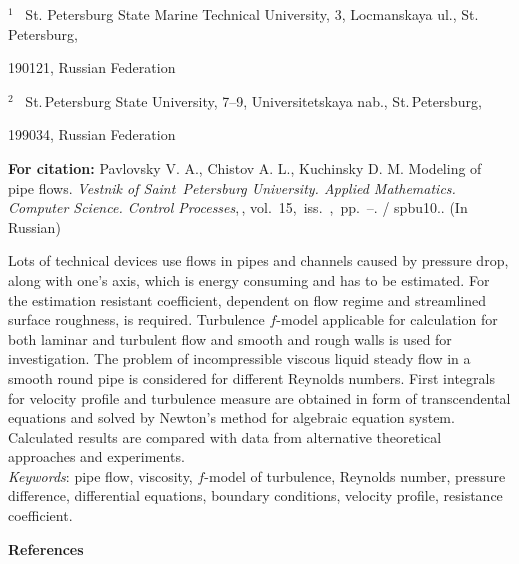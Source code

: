
{\normalsize

\vskip 6mm


}

\vskip 2mm

{\small


\vskip 2mm



{\footnotesize

\noindent%
$^1$~%
St. Petersburg State Marine Technical University, 3, Locmanskaya
ul., St. Petersburg,

\noindent%
\hskip2.45mm%
190121, Russian Federation

\noindent%
$^2$~%
St.\,Petersburg State University, 7--9, Universitetskaya nab.,
St.\,Petersburg,

\noindent%
\hskip2.45mm%
199034, Russian Federation

}


\vskip3mm


\noindent \textbf{For citation:}  Pavlovsky V. A., Chistov A. L.,
Kuchinsky D. M. Modeling of pipe flows. {\it Vestnik of
Saint~Petersburg University. Applied Mathematics. Computer
Science. Control Processes},\,\issueyear,
vol.~15,~iss.~\issuenum,~pp.~\pageref{p7}--\pageref{p7e}.
\doivyp/\enskip%
\!\!\!spbu10.\issueyear.  (In Russian)

\vskip3mm

{\leftskip=7mm\noindent Lots of technical devices use flows in
pipes and channels caused by pressure drop, along with one's axis,
which is energy consuming and has to be estimated.    For the
estimation resistant coefficient, dependent on flow regime and
streamlined surface roughness, is required. Turbulence $f$-model
applicable for calculation for both laminar and turbulent flow and
smooth and rough walls is used for investigation. The problem of
incompressible viscous liquid steady flow in a smooth round pipe
is considered for different Reynolds numbers. First integrals for
velocity profile and turbulence measure are obtained in form
of transcendental equations and solved by Newton's method for
algebraic equation system. Calculated results are compared with
data from alternative theoretical approaches and experiments.\\[1mm]
\textit{Keywords}: pipe flow, viscosity, $f$-model of turbulence,
Reynolds number, pressure difference, differential equations,
boundary conditions, velocity profile, resistance coefficient.
\par}

\vskip5mm

\noindent \textbf{References} }

